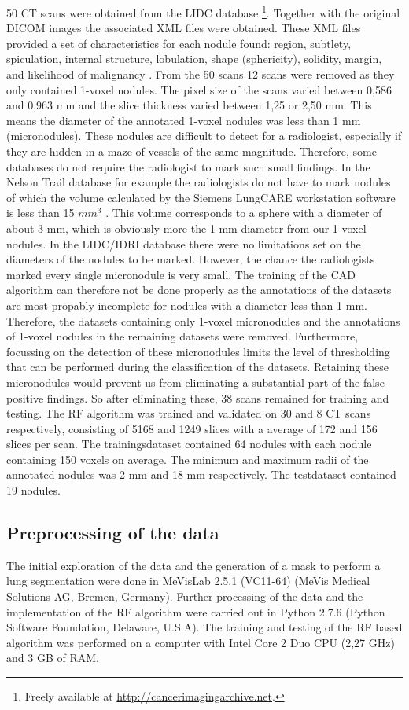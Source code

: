 50 CT scans were obtained from the LIDC database \footnote{Freely available at
\url{http://cancerimagingarchive.net}.}. Together with the original DICOM images
the associated XML files were obtained. These XML files provided a set of
characteristics for each nodule found: region, subtlety, spiculation, internal
structure, lobulation, shape (sphericity), solidity, margin, and likelihood of
malignancy \cite{lidcbase}. From the 50 scans 12 scans were removed as they only
contained 1-voxel nodules. The pixel size of the scans varied between 0,586 and
0,963 mm and the slice thickness varied between 1,25 or 2,50 mm. This means the
diameter of the annotated 1-voxel nodules was less than 1 mm (micronodules).
These nodules are difficult to detect for a radiologist, especially if they are
hidden in a maze of vessels of the same magnitude. Therefore, some databases do
not require the radiologist to mark such small findings. In the Nelson Trail
database for example the radiologists do not have to mark nodules of which the
volume calculated by the Siemens LungCARE workstation software is less than 15
$mm^3$ \cite{mur}. This volume corresponds to a sphere with a diameter of about
3 mm, which is obviously more the 1 mm diameter from our 1-voxel nodules.
In the LIDC/IDRI database there were no limitations set on the diameters of the
nodules to be marked. However, the chance the radiologists marked every single
micronodule is very small. The training of the CAD algorithm can therefore not
be done properly as the annotations of the datasets are most propably incomplete
for nodules with a diameter less than 1 mm. Therefore, the datasets containing
only 1-voxel micronodules and the annotations of 1-voxel nodules in the
remaining datasets were removed. Furthermore, focussing on the detection of
these micronodules limits the level of thresholding that can be performed during
the classification of the datasets. Retaining these micronodules would prevent
us from eliminating a substantial part of the false positive findings. So after
eliminating these, 38 scans remained for training and testing.
The RF algorithm was trained and validated on 30 and 8 CT scans respectively,
consisting of 5168 and 1249 slices with a average of 172 and 156 slices per
scan. The trainingsdataset contained 64 nodules with each nodule containing 150
voxels on average. The minimum and maximum radii of the annotated nodules was 2
mm and 18 mm respectively. The testdataset contained 19 nodules.


\subsection{Preprocessing of the data}
The initial exploration of the data and the generation of a mask to perform a
lung segmentation were done in MeVisLab 2.5.1 (VC11-64) (MeVis Medical Solutions
AG, Bremen, Germany). Further processing of the data and the implementation of
the RF algorithm were carried out in Python 2.7.6 (Python Software Foundation,
Delaware, U.S.A). The training and testing of the RF based algorithm was
performed on a computer with Intel Core 2 Duo CPU (2,27 GHz) and 3 GB of RAM.

